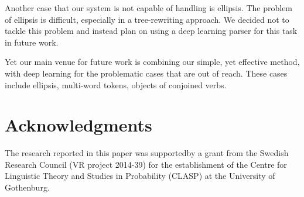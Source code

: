 \documentclass[11pt,a4paper]{article}
\begin{document}
Another case that our system is not capable of handling is
ellipsis. The problem of ellipsis is difficult, especially in a
tree-rewriting approach. We decided not to tackle this problem and
instead plan on using a deep learning parser for this task in future work.

Yet our main venue for future work is combining our simple, yet effective
method, with deep learning for the problematic cases that are out of
reach. These cases include ellipsis, multi-word tokens, objects of
conjoined verbs.




    
\section*{Acknowledgments}
The research reported in this paper was supportedby a grant from
the Swedish Research Council (VR project 2014-39) for the
establishment of the Centre for Linguistic Theory and Studies in
Probability (CLASP) at the University of Gothenburg.



\end{document}
